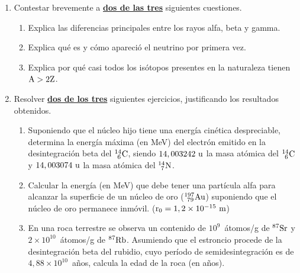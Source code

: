 \documentclass[11pt]{articulo}
\begin{document}
\begin{enumerate}

\item Contestar brevemente a {\bf\underline{dos de las tres}} siguientes cuestiones.

\begin{enumerate}
\item Explica las diferencias principales entre los rayos alfa, beta y gamma.
\item Explica qu\'e es y c\'omo apareci\'o el neutrino por primera vez.
\item Explica por qu\'e casi todos los is\'otopos presentes en la naturaleza tienen ${\rm A > 2Z}$.
\end{enumerate}

\item Resolver {\bf\underline{dos de los tres}} siguientes ejercicios, justificando los resultados obtenidos.

\begin{enumerate}

\item Suponiendo que el n\'ucleo hijo tiene una energ\'ia cin\'etica despreciable, determina la energ\'ia m\'axima (en MeV) del electr\'on emitido en la desintegraci\'on beta del ${\rm _{~6}^{14}C}$, siendo ${\rm 14,003242~u}$ la masa at\'omica del ${\rm _{~6}^{14}C}$ y ${\rm 14,003074~u}$ la masa at\'omica del ${\rm _{~7}^{14}N}$.

\item Calcular la energ\'ia (en MeV) que debe tener una part\'icula alfa para alcanzar la superficie de un n\'ucleo de oro (${\rm _{~79}^{197}Au}$) suponiendo que el n\'ucleo de oro permanece inm\'ovil. (${\rm r_0 = 1,2 \times 10^{-15}~m}$)

\item En una roca terrestre se observa un contenido de $10^9$~\'atomos/g de ${\rm ^{87}Sr}$ y $2 \times 10^{10}$~\'atomos/g de ${\rm ^{87}Rb}$. Asumiendo que el estroncio procede de la desintegraci\'on beta del rubidio, cuyo per\'iodo de semidesintegraci\'on es de $4,88 \times 10^{10}$~a\~{n}os, calcula la edad de la roca (en a\~{n}os).

\end{enumerate}
\end{enumerate}

\end{document}
